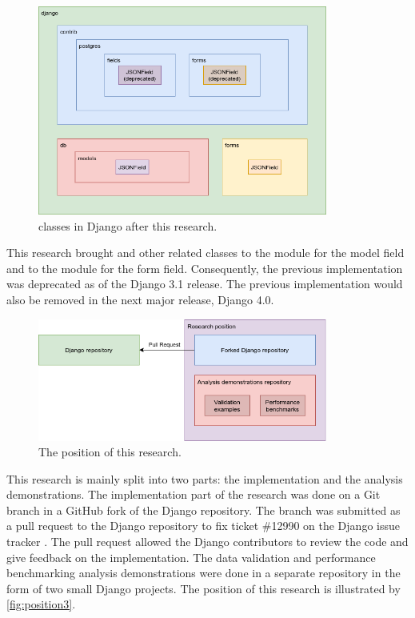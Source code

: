 \begin{figure}
	\centering
    \includegraphics[width=0.85\textwidth]{pics/position2.png}
	\caption{ classes in Django after this research.}
	\label{fig:position2}
\end{figure}

This research brought  and other related classes to the
 module for the model field and to the
 module for the form field. Consequently, the previous
implementation was deprecated as of the Django 3.1 release. The previous
implementation would also be removed in the next major release, Django 4.0.

\begin{figure}
	\centering
    \includegraphics[width=0.85\textwidth]{pics/position3.png}
	\caption{The position of this research.}
	\label{fig:position3}
\end{figure}

This research is mainly split into two parts: the 
implementation and the analysis demonstrations. The 
implementation part of the research was done on a Git branch in a GitHub fork
of the Django repository. The branch was submitted as a pull request to the
Django repository to fix ticket \#12990 on the Django issue tracker
\cite{ticket_12990}. The pull request allowed the Django contributors to review
the code and give feedback on the implementation. The data validation and
performance benchmarking analysis demonstrations were done in a separate
repository in the form of two small Django projects. The position of this
research is illustrated by \autoref{fig:position3}.

